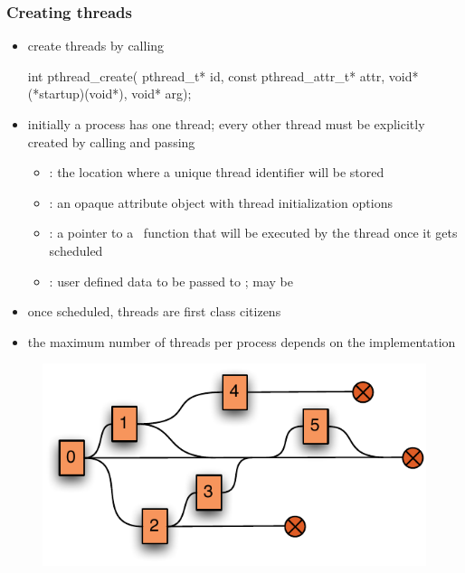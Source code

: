 \begin{frame}[fragile]
%
  \frametitle{Creating threads}
  \begin{itemize}
%
  \item create threads by calling
%
  \begin{C}
int pthread_create(
    pthread_t* id, const pthread_attr_t* attr,
    void* (*startup)(void*), void* arg);
  \end{C}
%
\item initially a process has one thread; every other thread must be explicitly created
  by calling  and passing
  \begin{itemize}
  \item {}: the location where a unique thread identifier will be stored
  \item {}: an opaque attribute object with thread initialization options
  \item {}: a pointer to a \CC\ function that will be executed by the thread
    once it gets scheduled
  \item {}: user defined data to be passed to ; may be \NULL
  \end{itemize}
%
  \item once scheduled, threads are first class citizens
%
  \item the maximum number of threads per process depends on the implementation
%
  \end{itemize}
%
    \begin{figure}
      \centering
      \includegraphics[scale=0.5]{figures/threads.pdf}
    \end{figure}
%
\end{frame}

